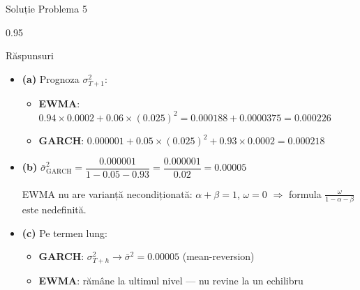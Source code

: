 \documentclass[9pt, aspectratio=169, t]{beamer}
\begin{document}
\begin{frame}{Soluție Problema 5}
    \begin{cminipage}{0.95\textwidth}
    \begin{exampleblock}{Răspunsuri}
        \begin{itemize}\setlength{\itemsep}{0pt}
            \item \textbf{(a)} Prognoza $\sigma_{T+1}^2$:
            \begin{itemize}\setlength{\itemsep}{0pt}
                \item \textbf{EWMA}: $0.94 \times 0.0002 + 0.06 \times (0.025)^2 = 0.000188 + 0.0000375 = 0.000226$
                \item \textbf{GARCH}: $0.000001 + 0.05 \times (0.025)^2 + 0.93 \times 0.0002 = 0.000218$
            \end{itemize}

            \vspace{0.2cm}

            \item \textbf{(b)} $\bar{\sigma}^2_{\text{GARCH}} = \dfrac{0.000001}{1 - 0.05 - 0.93} = \dfrac{0.000001}{0.02} = 0.00005$

            EWMA nu are varianță necondiționată: $\alpha + \beta = 1$, $\omega = 0$ $\Rightarrow$ formula $\frac{\omega}{1-\alpha-\beta}$ este nedefinită.

            \vspace{0.2cm}

            \item \textbf{(c)} Pe termen lung:
            \begin{itemize}\setlength{\itemsep}{0pt}
                \item \textbf{GARCH}: $\sigma_{T+h}^2 \to \bar{\sigma}^2 = 0.00005$ (mean-reversion)
                \item \textbf{EWMA}: rămâne la ultimul nivel --- nu revine la un echilibru
            \end{itemize}
        \end{itemize}
    \end{exampleblock}
    \end{cminipage}
\end{frame}
\end{document}
